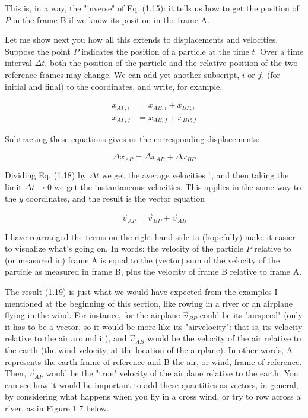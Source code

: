 \documentclass[10pt]{article}
\begin{document}
This is, in a way, the "inverse" of Eq. (1.15): it tells us how to get the position of $P$ in the frame B if we know its position in the frame A.

Let me show next you how all this extends to displacements and velocities. Suppose the point $P$ indicates the position of a particle at the time $t$. Over a time interval $\Delta t$, both the position of the particle and the relative position of the two reference frames may change. We can add yet another subscript, $i$ or $f$, (for initial and final) to the coordinates, and write, for example,


\begin{align*}
x_{A P, i} & =x_{A B, i}+x_{B P, i} \\
x_{A P, f} & =x_{A B, f}+x_{B P, f} \tag{1.17}
\end{align*}


Subtracting these equations gives us the corresponding displacements:


\begin{equation*}
\Delta x_{A P}=\Delta x_{A B}+\Delta x_{B P} \tag{1.18}
\end{equation*}


Dividing Eq. (1.18) by $\Delta t$ we get the average velocities ${ }^{1}$, and then taking the limit $\Delta t \rightarrow 0$ we get the instantaneous velocities. This applies in the same way to the $y$ coordinates, and the result is the vector equation


\begin{equation*}
\vec{v}_{A P}=\vec{v}_{B P}+\vec{v}_{A B} \tag{1.19}
\end{equation*}


I have rearranged the terms on the right-hand side to (hopefully) make it easier to visualize what's going on. In words: the velocity of the particle $P$ relative to (or measured in) frame A is equal to the (vector) sum of the velocity of the particle as measured in frame B, plus the velocity of frame B relative to frame A.

The result (1.19) is just what we would have expected from the examples I mentioned at the beginning of this section, like rowing in a river or an airplane flying in the wind. For instance, for the airplane $\vec{v}_{B P}$ could be its "airspeed" (only it has to be a vector, so it would be more like its "airvelocity": that is, its velocity relative to the air around it), and $\vec{v}_{A B}$ would be the velocity of the air relative to the earth (the wind velocity, at the location of the airplane). In other words, A represents the earth frame of reference and B the air, or wind, frame of reference. Then, $\vec{v}_{A P}$ would be the "true" velocity of the airplane relative to the earth. You can see how it would be important to add these quantities as vectors, in general, by considering what happens when you fly in a cross wind, or try to row across a river, as in Figure 1.7 below.
\end{document}
